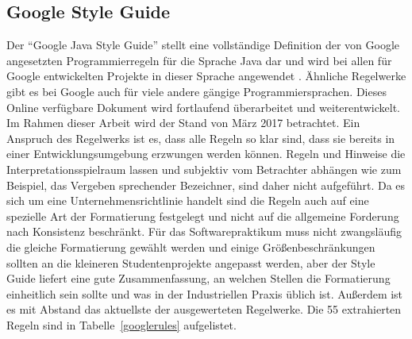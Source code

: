 \documentclass[da,ngerman]{stthesis}
\begin{document}
			\subsection{Google Style Guide}
				Der "`Google Java Style Guide"' stellt eine vollständige Definition der von Google angesetzten Programmierregeln für die Sprache Java dar und wird bei allen für Google entwickelten Projekte in dieser Sprache angewendet  \cite{GoogleStyleGuide}. Ähnliche Regelwerke gibt es bei Google auch für viele andere gängige Programmiersprachen. Dieses Online verfügbare Dokument wird fortlaufend überarbeitet und weiterentwickelt. Im Rahmen dieser Arbeit wird der Stand von März 2017 betrachtet. Ein Anspruch des Regelwerks ist es, dass alle Regeln so klar sind, dass sie bereits in einer Entwicklungsumgebung erzwungen werden können. Regeln und Hinweise die Interpretationsspielraum lassen und subjektiv vom Betrachter abhängen wie zum Beispiel, das Vergeben sprechender Bezeichner, sind daher nicht aufgeführt. \newline
				Da es sich um eine Unternehmensrichtlinie handelt sind die Regeln auch auf eine spezielle Art der Formatierung festgelegt und nicht auf die allgemeine Forderung nach Konsistenz beschränkt. Für das Softwarepraktikum muss nicht zwangsläufig die gleiche Formatierung gewählt werden und einige Größenbeschränkungen sollten an die kleineren Studentenprojekte angepasst werden, aber der Style Guide liefert eine gute Zusammenfassung, an welchen Stellen die Formatierung einheitlich sein sollte und was in der Industriellen Praxis üblich ist. Außerdem ist es mit Abstand das aktuellste der ausgewerteten Regelwerke. Die 55 extrahierten Regeln sind in Tabelle~\ref{googlerules} aufgelistet.
\end{document}
